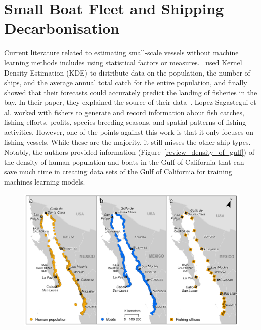\label{chap:2}
\section{Small Boat Fleet and Shipping Decarbonisation}
Current literature related to estimating small-scale vessels without machine learning methods includes using statistical factors or measures.~ used Kernel Density Estimation (KDE) to distribute data on the population, the number of ships, and the average annual total catch for the entire population, and finally showed that their forecasts could accurately predict the landing of fisheries in the bay. In their paper, they explained the source of their data~\cite{Lopez-Sagastegui2017Comparing}. Lopez-Sagastegui et al. worked with fishers to generate and record information about fish catches, fishing efforts, profits, species breeding seasons, and spatial patterns of fishing activities. However, one of the points against this work is that it only focuses on fishing vessels. While these are the majority, it still misses the other ship types. Notably, the authors provided information (Figure~\ref{review_density_of_gulf}) of the density of human population and boats in the Gulf of California that can save much time in creating data sets of the Gulf of California for training machines learning models.\\

\begin{figure}[t]
\center
\includegraphics[scale=0.83]{img/review_density_of_gulf.png}
\end{figure}

